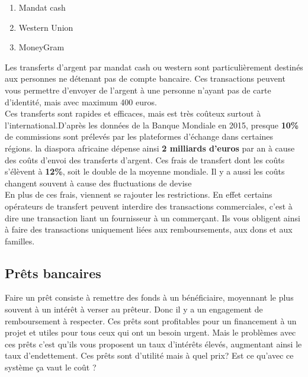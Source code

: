 \documentclass[12pt]{report}
\begin{document}
\begin{enumerate}
    \begin{enumerate}
        \item Mandat cash
        \item Western Union
        \item MoneyGram 
    \end{enumerate}
    
Les transferts d'argent par mandat cash ou western sont particulièrement destinés aux personnes ne détenant pas de compte bancaire. Ces transactions peuvent vous permettre d'envoyer de l'argent à une personne n'ayant pas de carte d'identité, mais avec maximum 400 euros.\\

\hspace{1cm} Ces transferts sont rapides et efficaces, mais est très coûteux surtout à l'international.D'après les données de la Banque Mondiale en 2015,  presque \textbf{10\%} de commissions sont prélevés par les plateformes d’échange dans certaines régions. la diaspora africaine dépense ainsi \textbf{2 milliards d'euros} par an à cause des coûts d'envoi des transferts d'argent.  Ces frais de transfert dont les coûts s'élèvent à \textbf{12\%}, soit le double de la moyenne mondiale. Il y a aussi les coûts changent souvent à cause des fluctuations de devise\\

\hspace{1cm} En plus de ces frais, viennent se rajouter les restrictions. En effet certains opérateurs de transfert peuvent interdire des transactions commerciales, c'est à dire une transaction liant un fournisseur à un commerçant. Ils vous obligent ainsi à faire des transactions uniquement liées aux remboursements, aux dons et aux familles.\\
    
\end{enumerate}

    \subsection{Prêts bancaires}
    
\hspace{1cm} Faire un prêt consiste à remettre des fonds à un bénéficiaire, moyennant le plus souvent à un intérêt à verser au prêteur. Donc il y a un engagement de remboursement à respecter. Ces prêts sont profitables pour un financement à un projet et utiles pour tous ceux qui ont un besoin urgent. Mais le problèmes avec ces prêts c'est qu'ils vous proposent un taux d'intérêts élevés, augmentant ainsi le taux d'endettement. Ces prêts sont d'utilité mais à quel prix? Est ce qu'avec ce système ça vaut le coût ?
\end{document}
